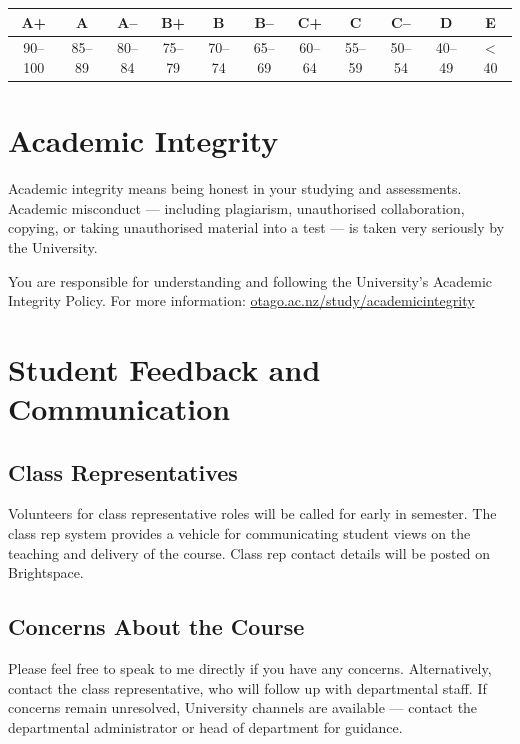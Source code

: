 \documentclass[11pt, a4paper]{article}
\begin{document}
\begin{center}
\begin{tabular}{ccccccccccc}
\toprule
A+ & A & A-- & B+ & B & B-- & C+ & C & C-- & D & E \\
\midrule
90--100 & 85--89 & 80--84 & 75--79 & 70--74 & 65--69 & 60--64 & 55--59 & 50--54 & 40--49 & $<$40 \\
\bottomrule
\end{tabular}
\end{center}

\section{Academic Integrity}

Academic integrity means being honest in your studying and assessments. Academic misconduct — including plagiarism, unauthorised collaboration, copying, or taking unauthorised material into a test — is taken very seriously by the University.

You are responsible for understanding and following the University's Academic Integrity Policy. For more information: \url{otago.ac.nz/study/academicintegrity}

\section{Student Feedback and Communication}

\subsection{Class Representatives}

Volunteers for class representative roles will be called for early in semester. The class rep system provides a vehicle for communicating student views on the teaching and delivery of the course. Class rep contact details will be posted on Brightspace.

\subsection{Concerns About the Course}

Please feel free to speak to me directly if you have any concerns. Alternatively, contact the class representative, who will follow up with departmental staff. If concerns remain unresolved, University channels are available — contact the departmental administrator or head of department for guidance.
\end{document}
